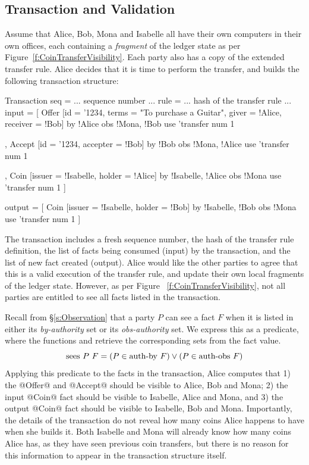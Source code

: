 \subsection{Transaction and Validation}
\label{s:Transactions}
Assume that Alice, Bob, Mona and Isabelle all have their own computers in their own offices, each containing a \emph{fragment} of the ledger state as per Figure~\ref{f:CoinTransferVisibility}. Each party also has a copy of the extended transfer rule. Alice decides that it is time to perform the transfer, and builds the following transaction structure:

\begin{small}
\begin{code}
Transaction
 seq    = ... sequence number ...
 rule   = ... hash of the transfer rule ...
 input  = [ Offer [id = '1234, terms = "To purchase a Guitar",
                   giver = !Alice, receiver = !Bob]
            by  {!Alice}            obs {!Mona, !Bob}
            use {'transfer}         num  1

          , Accept [id = '1234, accepter = !Bob]
            by  {!Bob}              obs {!Mona, !Alice}
            use {'transfer}         num 1

          , Coin   [issuer = !Isabelle, holder = !Alice]
            by  {!Isabelle, !Alice} obs {!Mona}
            use {'transfer}         num 1 ]

 output = [ Coin   [issuer = !Isabelle, holder = !Bob]
            by  {!Isabelle, !Bob}   obs {!Mona}
            use {'transfer}         num 1 ]
\end{code}
\end{small}

\eject{}
The transaction includes a fresh sequence number, the hash of the transfer rule definition, the list of facts being consumed (input) by the transaction, and the list of new fact created (output). Alice would like the other parties to agree that this is a valid execution of the transfer rule, and update their own local fragments of the ledger state. However, as per Figure ~\ref{f:CoinTransferVisibility}, not all parties are entitled to see all facts listed in the transaction.

Recall from \S\ref{s:Observation} that a party $P$ can see a fact $F$ when it is listed in either its \emph{by-authority} set or its \emph{obs-authority} set. We express this as a predicate, where the functions  and  retrieve the corresponding sets from the fact value.
$$
\textrm{sees}~ P~ F = (P \in \textrm{auth-by}~F) \lor (P \in \textrm{auth-obs}~F)
$$
Applying this predicate to the facts in the transaction, Alice computes that 1) the @Offer@ and @Accept@ should be visible to Alice, Bob and Mona; 2) the input @Coin@ fact should be visible to Isabelle, Alice and Mona, and 3) the output @Coin@ fact should be visible to Isabelle, Bob and Mona. Importantly, the details of the transaction do not reveal how many coins Alice happens to have when she builds it. Both Isabelle and Mona will already know how many coins Alice has, as they have seen previous coin transfers, but there is no reason for this information to appear in the transaction structure itself.


